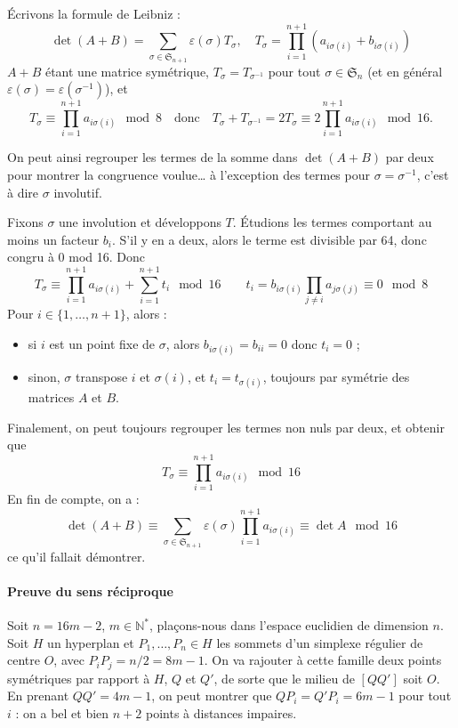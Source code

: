 \documentclass[a4paper, 11pt]{article}
\def\N{\mathbb{N}}
\def\Sigmap{\mathfrak{S}}
\begin{document}
Écrivons la formule de Leibniz :
\[ \det(A+B) = \sum_{\sigma \in \Sigmap_{n+1}} \varepsilon(\sigma) T_\sigma,
  \quad T_\sigma = \prod_{i=1}^{n+1} (a_{i \sigma(i)} + b_{i \sigma(i)}) \]
$A+B$ étant une matrice symétrique, $T_\sigma = T_{\sigma^{-1}}$ pour tout
$\sigma \in \Sigmap_n$ (et en général $\varepsilon(\sigma) =
\varepsilon(\sigma^{-1})$), et
\[ T_\sigma \equiv \prod_{i=1}^{n+1} a_{i \sigma(i)} \mod 8 \quad \text{donc}
  \quad T_\sigma + T_{\sigma^{-1}} = 2 T_\sigma \equiv 2 \prod_{i=1}^{n+1} a_{i
    \sigma(i)} \mod 16. \]

On peut ainsi regrouper les termes de la somme dans $\det(A+B)$ par deux pour
montrer la congruence voulue… à l'exception des termes pour $\sigma =
\sigma^{-1}$, c'est à dire $\sigma$ involutif.

Fixons $\sigma$ une involution et développons $T$. Étudions les termes
comportant au moins un facteur $b_i$. S'il y en a deux, alors le terme est
divisible par 64, donc congru à 0 mod 16. Donc
\[ T_\sigma \equiv \prod_{i=1}^{n+1} a_{i \sigma(i)} + \sum_{i=1}^{n+1} t_i
  \mod 16 \qquad t_i = b_{i \sigma(i)} \prod_{j \neq i} a_{j \sigma(j)}
  \equiv 0 \mod 8 \]
Pour $i \in \{1, \ldots, n+1\}$, alors :
\begin{itemize}
\item si $i$ est un point fixe de $\sigma$, alors $b_{i \sigma(i)} = b_{ii} = 0$
  donc $t_i = 0$ ;
\item sinon, $\sigma$ transpose $i$ et $\sigma(i)$, et $t_i = t_{\sigma(i)}$,
  toujours par symétrie des matrices $A$ et $B$.
\end{itemize}
Finalement, on peut toujours regrouper les termes non nuls par deux, et obtenir
que
\[ T_\sigma \equiv \prod_{i=1}^{n+1} a_{i \sigma(i)} \mod 16 \]
En fin de compte, on a :
\[ \det(A+B) \equiv \sum_{\sigma \in \Sigmap_{n+1}} \varepsilon(\sigma)
  \prod_{i=1}^{n+1} a_{i \sigma(i)} \equiv \det A \mod 16 \]
ce qu'il fallait démontrer.

\paragraph{Preuve du sens réciproque}

Soit $n = 16m - 2$, $m \in \N^*$, plaçons-nous dans l'espace euclidien de
dimension $n$. Soit $H$ un hyperplan et $P_1, \ldots, P_n \in H$ les sommets
d'un simplexe régulier de centre $O$, avec $P_iP_j = n/2 = 8m-1$. On va rajouter
à cette famille deux points symétriques par rapport à $H$, $Q$ et $Q'$, de sorte
que le milieu de $[QQ']$ soit $O$. En prenant $QQ' = 4m - 1$, on peut montrer
que $QP_i = Q'P_i = 6m - 1$ pour tout $i$ : on a bel et bien $n+2$ points à
distances impaires.
\end{document}
